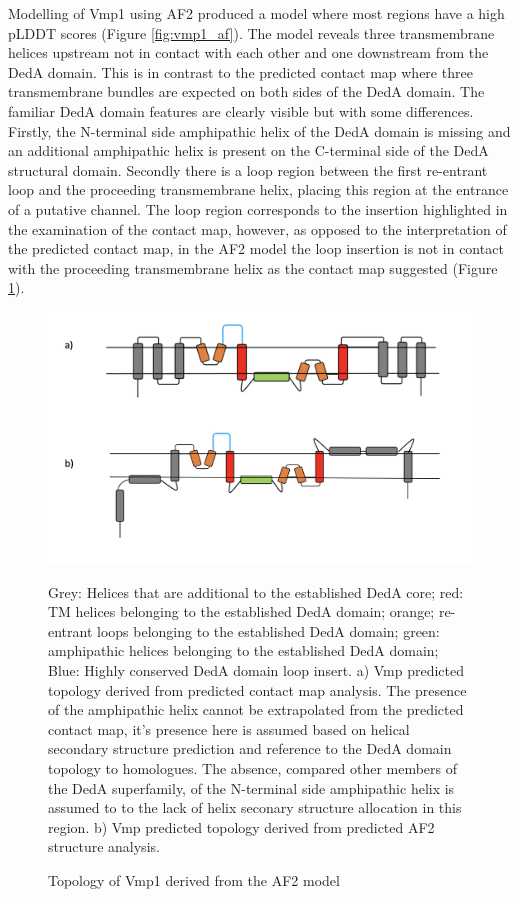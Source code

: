 Modelling of Vmp1 using AF2 produced a  model where most regions have a high pLDDT scores (Figure \ref{fig:vmp1_af}).  The model reveals three transmembrane helices upstream not in contact with each other and one downstream from the DedA domain.  This is in contrast to the predicted contact map where three transmembrane bundles are expected on both sides of the DedA domain. The familiar DedA domain features are clearly visible but with some differences.  Firstly, the N-terminal side amphipathic helix of the DedA domain is missing and an additional amphipathic helix is present on the C-terminal side of the DedA structural domain.  Secondly there is a loop region between the first re-entrant loop and the proceeding transmembrane helix, placing this region at the entrance of a putative channel.  The loop region corresponds to the insertion highlighted in the examination of the contact map, however, as opposed to the interpretation of the predicted contact map, in the AF2 model the loop insertion is not in contact with the proceeding transmembrane helix as the contact map suggested (Figure \ref{fig:vmp1_topt}). 


\begin{figure}[th!]
    \centering
    \includegraphics[width=170mm, scale =1]{Results/vmp1_topo.png}
    \caption{Topology of Vmp1 derived from the AF2 model}
    \label{fig:vmp1_topt}
    Grey: Helices that are additional to the established DedA core; red: TM helices belonging to the established DedA domain; orange; re-entrant loops belonging to the established DedA domain; green: amphipathic helices belonging to the established DedA domain; Blue: Highly conserved DedA domain loop insert.  a) Vmp predicted topology derived from predicted contact map analysis.  The presence of the amphipathic helix cannot be extrapolated from the predicted contact map, it's presence here is assumed based on helical secondary structure prediction and reference to the DedA domain topology to homologues.  The absence, compared other members of the DedA superfamily, of the N-terminal side amphipathic helix is assumed to to the lack of helix seconary structure allocation in this region.  b) Vmp predicted topology derived from predicted AF2 structure analysis.
    \small
    
\end{figure}


